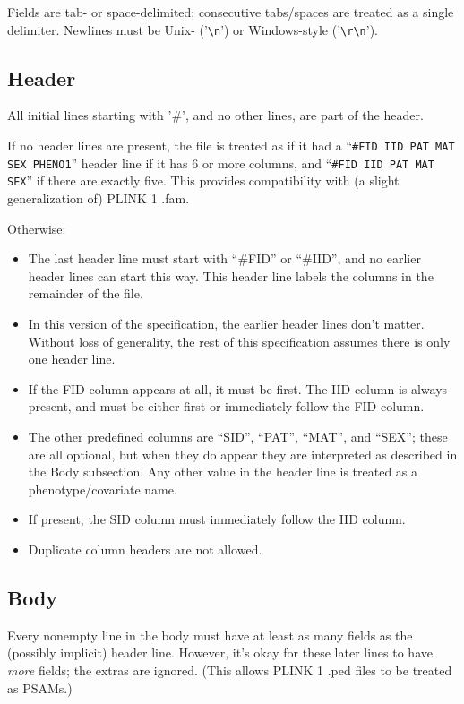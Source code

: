\documentclass[8pt]{article}
\begin{document}
Fields are tab- or space-delimited; consecutive tabs/spaces are treated as a
single delimiter.  Newlines must be Unix- ('\texttt{\textbackslash n}') or
Windows-style ('\texttt{\textbackslash r\textbackslash n}').

\subsection{Header}

All initial lines starting with '\#', and no other lines, are part of the
header.

If no header lines are present, the file is treated as if it had a
``\texttt{\#FID IID PAT MAT SEX PHENO1}'' header line if it has 6 or more
columns, and ``\texttt{\#FID IID PAT MAT SEX}'' if there are exactly five.
This provides compatibility with (a slight generalization of) PLINK 1 .fam.

Otherwise:

\begin{itemize}
\item The last header line must start with ``\#FID'' or ``\#IID'', and no
  earlier header lines can start this way.  This header line labels the columns
  in the remainder of the file.
\item In this version of the specification, the earlier header lines don't
  matter.  Without loss of generality, the rest of this specification assumes
  there is only one header line.
\item If the FID column appears at all, it must be first.  The IID column is
  always present, and must be either first or immediately follow the FID
  column.
\item The other predefined columns are ``SID'', ``PAT'', ``MAT'', and ``SEX'';
  these are all optional, but when they do appear they are interpreted as
  described in the Body subsection.  Any other value in the header line is
  treated as a phenotype/covariate name.
\item If present, the SID column must immediately follow the IID column.
\item Duplicate column headers are not allowed.
\end{itemize}

\subsection{Body}

Every nonempty line in the body must have at least as many fields as the
(possibly implicit) header line.  However, it's okay for these later lines to
have \textit{more} fields; the extras are ignored.  (This allows PLINK 1 .ped
files to be treated as PSAMs.)
\end{document}
